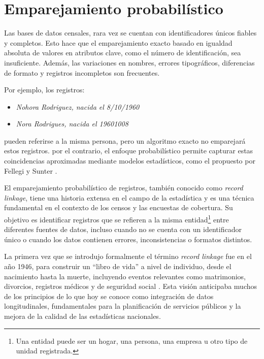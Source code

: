 \documentclass[
  12pt,
]{book}
\providecommand{\tightlist}{%
  \setlength{\itemsep}{0pt}\setlength{\parskip}{0pt}}
\begin{document}
\chapter{Emparejamiento probabilístico}\label{emparejamiento-probabiluxedstico}

Las bases de datos censales, rara vez se cuentan con identificadores únicos fiables y completos. Esto hace que el emparejamiento exacto basado en igualdad absoluta de valores en atributos clave, como el número de identificación, sea insuficiente. Además, las variaciones en nombres, errores tipográficos, diferencias de formato y registros incompletos son frecuentes.

Por ejemplo, los registros:

\begin{itemize}
\tightlist
\item
  \emph{Nohora Rodriguez, nacida el 8/10/1960}
\item
  \emph{Nora Rodrigues, nacida el 19601008}
\end{itemize}

pueden referirse a la misma persona, pero un algoritmo exacto no emparejará estos registros. por el contrario, el enfoque probabilístico permite capturar estas coincidencias aproximadas mediante modelos estadísticos, como el propuesto por Fellegi y Sunter \citep{fellegi1969theory}.

El emparejamiento probabilístico de registros, también conocido como \emph{record linkage}, tiene una historia extensa en el campo de la estadística y es una técnica fundamental en el contexto de los censos y las encuestas de cobertura. Su objetivo es identificar registros que se refieren a la misma entidad\footnote{Una entidad puede ser un hogar, una persona, una empresa u otro tipo de unidad registrada.} entre diferentes fuentes de datos, incluso cuando no se cuenta con un identificador único o cuando los datos contienen errores, inconsistencias o formatos distintos.

La primera vez que se introdujo formalmente el término \emph{record linkage} fue en el año 1946, para construir un ``libro de vida'' a nivel de individuo, desde el nacimiento hasta la muerte, incluyendo eventos relevantes como matrimonios, divorcios, registros médicos y de seguridad social \citep{dunn1946}. Esta visión anticipaba muchos de los principios de lo que hoy se conoce como integración de datos longitudinales, fundamentales para la planificación de servicios públicos y la mejora de la calidad de las estadísticas nacionales.
\end{document}
